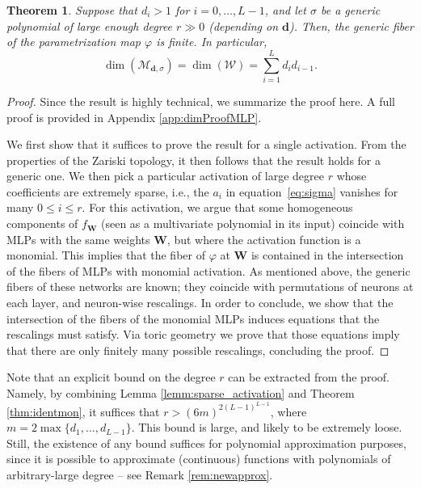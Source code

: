 \documentclass{article} %
\def\eqref#1{equation~\ref{#1}}
\theoremstyle{plain}%
\newtheorem{thm}{Theorem}[section]
\theoremstyle{definition}
\theoremstyle{remark}
\begin{document}
\begin{thm}
\label{thm:dimmainbody}
Suppose that $d_i > 1$ for $i = 0, \dots, L-1$, and let $\sigma$ be a generic polynomial of large enough degree $r \gg 0$ (depending on $\mathbf{d}$). Then, the generic fiber of the parametrization map $\varphi$ is finite. In particular,
\begin{equation}
    \dim(\mathcal{M}_{\mathbf{d}, \sigma})  = \dim(\mathcal{W})  = \sum_{i=1}^L d_i d_{i-1}. 
\end{equation}
\end{thm}
\begin{proof}   
Since the result is highly technical, we summarize the proof here. A full proof is provided in  Appendix \ref{app:dimProofMLP}. 

We first show that it suffices to prove the result for a single activation. From the properties of the Zariski topology, it then follows that the result holds for a generic one. We then pick a particular activation of large degree $r$ whose coefficients are extremely sparse, i.e., the $a_i$ in \eqref{eq:sigma} vanishes for many $0 \leq  i \leq r$. For this activation, we argue that some homogeneous components of $f_{\mathbf{W}}$ (seen as a multivariate polynomial in its input) coincide with MLPs with the same weights $\mathbf{W}$, but where the activation function is a monomial. This implies that the fiber of $\varphi$ at $\mathbf{W}$ is contained in the intersection of the fibers of MLPs with monomial activation. As mentioned above, the generic fibers of these networks are known; they coincide with permutations of neurons at each layer, and neuron-wise rescalings. In order to conclude, we show that the intersection of the fibers of the monomial MLPs induces equations that the rescalings must satisfy. Via toric geometry we prove that those equations imply that there are only finitely many possible rescalings, concluding the proof.         
\end{proof} 


Note that an explicit bound on the degree $r$ can be extracted from the proof. Namely, by combining Lemma \ref{lemm:sparse_activation} and Theorem \ref{thm:identmon}, it suffices that $r > (6m)^{2(L-1)^{L-1}}$, where $m= 2\max\{d_1,\ldots,d_{L-1}\}$. This bound is large, and likely to be extremely loose. Still, the existence of any bound suffices for polynomial approximation purposes, since it is possible to approximate (continuous) functions with polynomials of arbitrary-large degree -- see Remark \ref{rem:newapprox}. 
\end{document}
